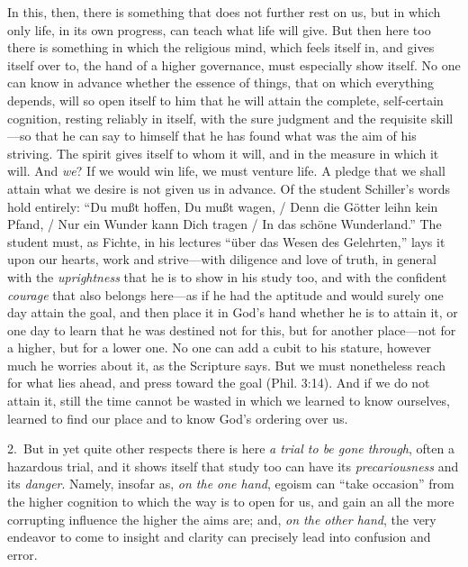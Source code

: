 \documentclass[12pt,a4paper]{book}
\begin{document}
In this, then, there is something that does not further rest on us, but in which only life, in its
own progress, can teach what life will give. But then here too there is something in which the
religious mind, which feels itself in, and gives itself over to, the hand of a higher governance,
must especially show itself. No one can know in advance whether the essence of things, that on
which everything depends, will so open itself to him that he will attain the complete, self-certain
cognition, resting reliably in itself, with the sure judgment and the requisite skill---so that he
can say to himself that he has found what was the aim of his striving. The spirit gives itself to
whom it will, and in the measure in which it will. And \emph{we}? If we would win life, we must venture
life. A pledge that we shall attain what we desire is not given us in advance. Of the student
Schiller's words hold entirely: ``Du mußt hoffen, Du mußt wagen, / Denn die Götter leihn kein
Pfand, / Nur ein Wunder kann Dich tragen / In das schöne Wunderland.'' The student must, as Fichte,
in his lectures ``über das Wesen des Gelehrten,'' lays it upon our hearts, work and strive---with
diligence and love of truth, in general with the \emph{uprightness} that he is to show in his study
too, and with the confident \emph{courage} that also belongs here---as if he had the aptitude and
would surely one day attain the goal, and then place it in God's hand whether he is to attain it, or
one day to learn that he was destined not for this, but for another place---not for a higher, but
for a lower one. No one can add a cubit to his stature, however much he worries about it, as the
Scripture says. But we must nonetheless reach for what lies ahead, and press toward the goal (Phil.
3:14). And if we do not attain it, still the time cannot be wasted in which we learned to know
ourselves, learned to find our place and to know God's ordering over us.

2.~But in yet quite other respects there is here \emph{a trial to be gone through}, often a
hazardous trial, and it shows itself that study too can have its \emph{precariousness} and its
\emph{danger}. Namely, insofar as, \emph{on the one hand}, egoism can ``take occasion'' from the
higher cognition to which the way is to open for us, and gain an all the more corrupting influence
the higher the aims are; and, \emph{on the other hand}, the very endeavor to come to insight and
clarity can precisely lead into confusion and error.
\end{document}
